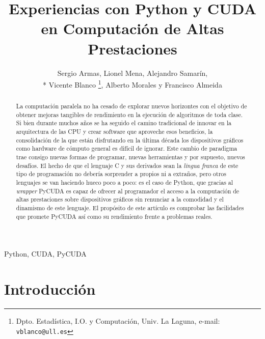 \documentclass[twocolumn,twoside]{Jornadas}
\begin{document}
\title{Experiencias con Python y CUDA en Computación de Altas Prestaciones}

\author{Sergio Armas, %
     Lionel Mena, %
     Alejandro Samarín,\\*%
     Vicente Blanco %
     \thanks{Dpto. Estadística, I.O. y Computación, Univ. La Laguna, e-mail: {\tt vblanco@ull.es}}, %
     Alberto Morales y %
     Francisco Almeida
}

\maketitle
\markboth{}{}
\pagestyle{empty} 
\thispagestyle{empty} %

\begin{abstract}
La computación paralela no ha cesado de explorar nuevos horizontes con el objetivo de obtener mejoras tangibles de rendimiento en la ejecución de algoritmos de toda clase. Si bien durante muchos años se ha seguido el camino tradicional de innovar en la arquitectura de las CPU y crear software que aproveche esos beneficios, la consolidación de la que están disfrutando en la última década los dispositivos gráficos como hardware de cómputo general es difícil de ignorar. Este cambio de paradigma trae consigo nuevas formas de programar, nuevas herramientas y por supuesto, nuevos desafíos. El hecho de que el lenguaje C y sus derivados sean la \emph{lingua franca} de este tipo de programación no debería sorprender a propios ni a extraños, pero otros lenguajes se van haciendo hueco poco a poco: es el caso de Python, que gracias al \emph{wrapper} PyCUDA \cite{DBLP:journals/corr/abs-0911-3456} es capaz de ofrecer al programador el acceso a la computación de altas prestaciones sobre dispositivos gráficos sin renunciar a la comodidad y el dinamismo de este lenguaje. El propósito de este artículo es comprobar las facilidades que promete PyCUDA así como su rendimiento frente a problemas reales.
\end{abstract}

\begin{keywords}
Python, CUDA, PyCUDA
\end{keywords}

\section{Introducción}
\end{document}
